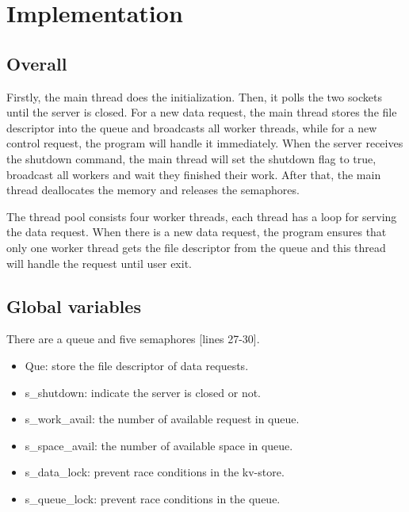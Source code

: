 \documentclass[10pt, a4paper]{article}
\title{\mytitle}
\author{\myauthor\hspace{0.2em}}
\begin{document}
\maketitle

\newpage

\section{Implementation}
    
\subsection{Overall}
    
Firstly, the main thread does the initialization. Then, it polls the two sockets until the server is closed. For a new data request, the main thread stores the file descriptor into the queue and broadcasts all worker threads, while for a new control request, the program will handle it immediately. When the server receives the shutdown command, the main thread will set the shutdown flag to true, broadcast all workers and wait they finished their work. After that, the main thread deallocates the memory and releases the semaphores.

The thread pool consists four worker threads, each thread has a loop for serving the data request. When there is a new data request, the program ensures that only one worker thread gets the file descriptor from the queue and this thread will handle the request until user exit.
    
\subsection{Global variables}

There are a queue and five semaphores [lines 27-30].

\begin{itemize}
    \item Que: store the file descriptor of data requests.
    \item s\_shutdown: indicate the server is closed or not.
    \item s\_work\_avail: the number of available request in queue.
    \item s\_space\_avail: the number of available space in queue.
    \item s\_data\_lock: prevent race conditions in the kv-store.
    \item s\_queue\_lock: prevent race conditions in the queue.
\end{itemize}
    
\end{document}
